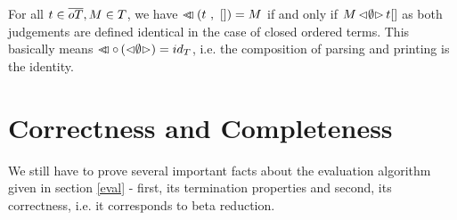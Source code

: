 \documentclass[submission,copyright,creativecommons]{eptcs}
\begin{document}
For all $t \in \overline{oT}, M \in T$, we have $\lhd \hspace{-8pt} \lhd \left( t \ , \ [] \right) = M$ if and only if $M \, { \mathord{\lhd} {\emptyset} \mathord{\rhd} } \, t []$ as both judgements are defined identical in the case of closed ordered terms. This basically means $\lhd \hspace{-8pt} \lhd \circ \left(\mathord{\lhd} {\emptyset} \mathord{\rhd}\right)  = id_{T}$, i.e. the composition of parsing and printing is the identity.


\section{Correctness and Completeness}


We still have to prove several important facts about the evaluation algorithm given in section \ref{eval} - first, its termination properties and second, its correctness, i.e. it corresponds to beta reduction. 
\end{document}
